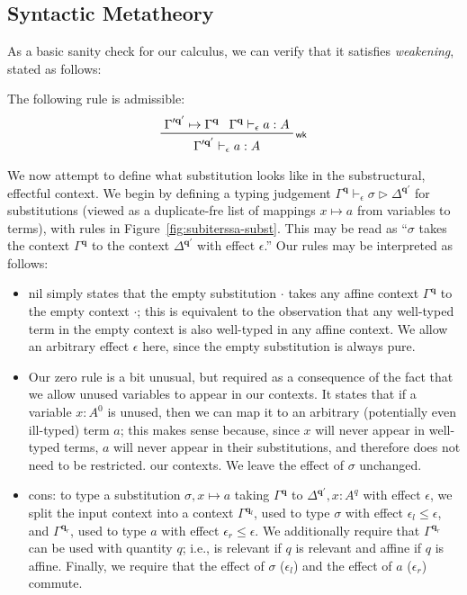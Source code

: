 \documentclass[acmsmall,screen,review]{acmart}
\newcommand{\mb}[1]{\ensuremath{\mathbf{#1}}}
\newcommand{\cwk}[2]{#1 \mapsto #2}
\newcommand{\rle}[1]{{\scriptsize\textsf{#1}}}
\newcommand{\hasty}[4]{#1 \vdash_{#2} #3: {#4}}
\newcommand{\issubst}[4]{#1 \vdash_{#2} #3 \rhd #4}
\newcommand{\brle}[1]{{\textsf{#1}}}
\begin{document}
\subsection{Syntactic Metatheory}

As a basic sanity check for our calculus, we can verify that it satisfies \emph{weakening}, stated
as follows:
\begin{lemma}[name=Weakening, restate=synmonwk]
  The following rule is admissible:
  \begin{equation*}
    \prftree[r]{\rle{wk}}
      {\cwk{\Gamma'^{\mb{q}'}}{\Gamma^{\mb{q}}}}
      {\hasty{\Gamma^{\mb{q}}}{\epsilon}{a}{A}}
      {\hasty{\Gamma'^{\mb{q}'}}{\epsilon}{a}{A}}
  \end{equation*}
\end{lemma}

We now attempt to define what substitution looks like in the substructural, effectful context. We
begin by defining a typing judgement $\issubst{\Gamma^{\mb{q}}}{\epsilon}{\sigma}{\Delta^{\mb{q}'}}$
for substitutions (viewed as a duplicate-fre list of mappings $x \mapsto a$ from variables to
terms), with rules in Figure~\ref{fig:subiterssa-subst}. This may be read as ``$\sigma$ takes the
context $\Gamma^{\mb{q}}$ to the context $\Delta^{\mb{q}'}$ with effect $\epsilon$.'' Our rules may
be interpreted as follows:
\begin{itemize}
  \item \brle{nil} simply states that the empty substitution $\cdot$ takes any affine context
  $\Gamma^{\mb{q}}$ to the empty context $\cdot$; this is equivalent to the observation that any
  well-typed term in the empty context is also well-typed in any affine context. We allow an
  arbitrary effect $\epsilon$ here, since the empty substitution is always pure.
  \item Our \brle{zero} rule is a bit unusual, but required as a consequence of the fact that we
  allow unused variables to appear in our contexts. It states that if a variable $x : A^0$ is
  unused, then we can map it to an arbitrary (potentially even ill-typed) term $a$; this makes sense
  because, since $x$ will never appear in well-typed terms, $a$ will never appear in their
  substitutions, and therefore does not need to be restricted. our contexts. We leave the effect of
  $\sigma$ unchanged.
  \item \brle{cons}: to type a substitution $\sigma, x \mapsto a$ taking  $\Gamma^{\mb{q}}$ to
  $\Delta^{\mb{q}'}, x: A^q$ with effect $\epsilon$, we split the input context into a context
  $\Gamma^{\mb{q}_l}$, used to type $\sigma$ with effect $\epsilon_l \leq \epsilon$, and
  $\Gamma^{\mb{q}_r}$, used to type $a$ with effect $\epsilon_r \leq \epsilon$. We additionally
  require that $\Gamma^{\mb{q}_r}$ can be used with quantity $q$; i.e., is relevant if $q$ is
  relevant and affine if $q$ is affine. Finally, we require that the effect of $\sigma$
  ($\epsilon_l$) and the effect of $a$ ($\epsilon_r$) commute.
\end{itemize}
\end{document}
